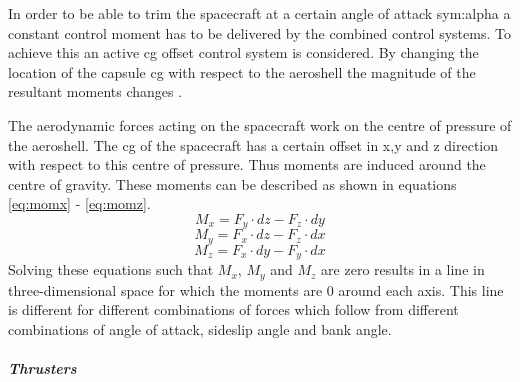In order to be able to trim the spacecraft at a certain angle of attack \gls{sym:alpha} a constant control moment has to be delivered by the combined control systems. To achieve this an active \gls{cg} offset control system is considered. By changing the location of the capsule \gls{cg} with respect to the aeroshell the magnitude of the resultant moments changes \cite{Mulqueen1991}. 

The aerodynamic forces acting on the spacecraft work on the centre of pressure of the aeroshell. The \gls{cg} of the spacecraft has a certain offset in x,y and z direction with respect to this centre of pressure. Thus moments are induced around the centre of gravity. These moments can be described as shown in equations \ref{eq:momx} - \ref{eq:momz}.
\begin{equation}
\label{eq:momx}
M_x = F_y \cdot dz - F_z \cdot dy
\end{equation}
\begin{equation}
\label{eq:momy}
M_y = F_x \cdot dz - F_z \cdot dx
\end{equation}
\begin{equation}
\label{eq:momz}
M_z = F_x \cdot dy - F_y \cdot dx
\end{equation}
Solving these equations such that $M_{x}$, $M_{y}$ and $M_{z}$ are zero results in a line in three-dimensional space for which the moments are 0 around each axis. This line is different for different combinations of forces which follow from different combinations of angle of attack, sideslip angle and bank angle.

\subparagraph{Thrusters}
\label{subpar:thrusters}


